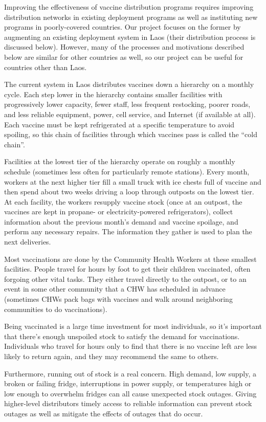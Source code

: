 \documentclass{acm_proc_article-sp}
\begin{document}
Improving the effectiveness of vaccine distribution programs requires improving distribution networks in existing deployment programs as well as instituting new programs in poorly-covered countries. Our project focuses on the former by augmenting an existing deployment system in Laos (their distribution process is discussed below). However, many of the processes and motivations described below are similar for other countries as well, so our project can be useful for countries other than Laos.

The current system in Laos distributes vaccines down a hierarchy on a monthly cycle. Each step lower in the hierarchy contains smaller facilities with progressively lower capacity, fewer staff, less frequent restocking, poorer roads, and less reliable equipment, power, cell service, and Internet (if available at all). Each vaccine must be kept refrigerated at a specific temperature to avoid spoiling, so this chain of facilities through which vaccines pass is called the ``cold chain''.

Facilities at the lowest tier of the hierarchy operate on roughly a monthly schedule (sometimes less often for particularly remote stations). Every month, workers at the next higher tier fill a small truck with ice chests full of vaccine and then spend about two weeks driving a loop through outposts on the lowest tier. At each facility, the workers resupply vaccine stock (once at an outpost, the vaccines are kept in propane- or electricity-powered refrigerators), collect information about the previous month's demand and vaccine spoilage, and perform any necessary repairs. The information they gather is used to plan the next deliveries. 

Most vaccinations are done by the Community Health Workers at these smallest facilities. People travel for hours by foot to get their children vaccinated, often forgoing other vital tasks. They either travel directly to the outpost, or to an event in some other community that a CHW has scheduled in advance (sometimes CHWs pack bags with vaccines and walk around neighboring communities to do vaccinations). 

Being vaccinated is a large time investment for most individuals, so it's important that there's enough unspoiled stock to satisfy the demand for vaccinations. Individuals who travel for hours only to find that there is no vaccine left are less likely to return again, and they may recommend the same to others. 

Furthermore, running out of stock is a real concern. High demand, low supply, a broken or failing fridge, interruptions in power supply, or temperatures high or low enough to overwhelm fridges can all cause unexpected stock outages. Giving higher-level distributors timely access to reliable information can prevent stock outages as well as mitigate the effects of outages that do occur. 
\end{document}

